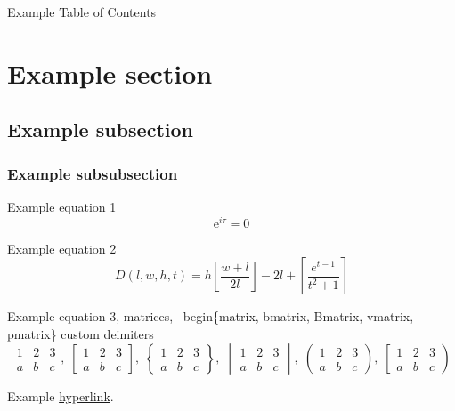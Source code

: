 \documentclass[11pt]{article}
\begin{document}
Example Table of Contents

\tableofcontents

\section{Example section}
\subsection{Example subsection}
\subsubsection{Example subsubsection}

Example equation 1
\begin{equation}
    \mathrm{e}^{i\tau} = 0
\end{equation}

Example equation 2
\begin{equation}
    D(l,w,h,t) = h \left\lfloor \frac{w+l}{2l} \right\rfloor - 2l + \left\lceil \frac{e^{t-1}}{t^2+1} \right\rceil
\end{equation}

Example equation 3, matrices, \ begin\{matrix, bmatrix, Bmatrix, vmatrix, pmatrix\} custom deimiters
\begin{equation}
    \begin{matrix} 1 & 2 & 3 \\ a & b & c \end{matrix}, \;
    \begin{bmatrix} 1 & 2 & 3 \\ a & b & c \end{bmatrix}, \;
    \begin{Bmatrix} 1 & 2 & 3 \\ a & b & c \end{Bmatrix}, \;
    \begin{vmatrix} 1 & 2 & 3 \\ a & b & c \end{vmatrix}, \;
    \begin{pmatrix} 1 & 2 & 3 \\ a & b & c \end{pmatrix}, \;
    \left[ \begin{matrix} 1 & 2 & 3 \\ a & b & c \end{matrix} \right)
\end{equation}

Example \href{https://www.ntnu.edu}{hyperlink}.
\end{document}
